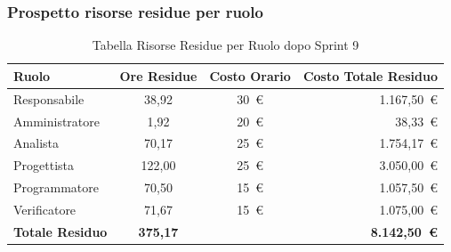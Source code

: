 \subsubsection{Prospetto risorse residue per ruolo}
\begin{table}[H]
    \centering
    \renewcommand{\arraystretch}{1.3}
    \begin{tabularx}{\textwidth}{|X|c|c|r|}
        \hline
        \textbf{Ruolo} & \textbf{Ore Residue} & \textbf{Costo Orario} &
        \textbf{Costo Totale Residuo} \\
        \hline
        Responsabile   & 38,92 & 30~\euro & 1.167{,}50~\euro \\
        Amministratore & 1,92 & 20~\euro &   38{,}33~\euro \\
        Analista       & 70,17 & 25~\euro & 1.754{,}17~\euro \\
        Progettista    & 122,00 & 25~\euro & 3.050{,}00~\euro \\
        Programmatore  & 70,50 & 15~\euro & 1.057{,}50~\euro \\
        Verificatore   & 71,67 & 15~\euro & 1.075{,}00~\euro \\
        \hline
        \textbf{Totale Residuo} & \textbf{375,17} & &
        \textbf{8.142{,}50~\euro} \\
        \hline
    \end{tabularx}
    \caption{Tabella Risorse Residue per Ruolo dopo Sprint 9}
\end{table}


